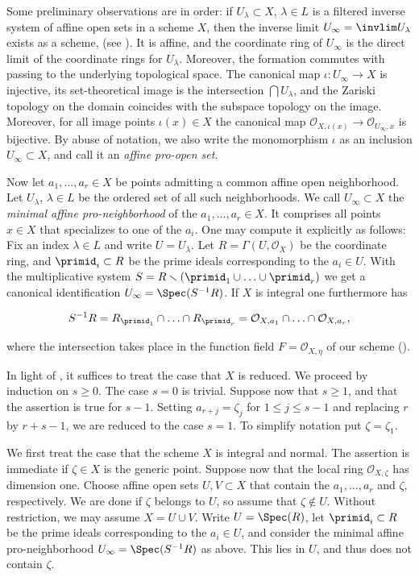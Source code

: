 \documentclass[12pt]{amsart}
\newcommand{\ra}{\rightarrow}
\begin{document}
Some preliminary observations are in order: if $U_\lambda\subset X$, $\lambda\in L$ is a filtered inverse system of affine open sets in a scheme $X$, then the  inverse limit $U_\infty=\invlim U_\lambda$ exists as a scheme, (see \cite[Sec. 8.2]{MR217086}). It is affine, and the coordinate ring of $U_\infty$ is the direct limit of the coordinate rings for $U_\lambda$. Moreover, the formation commutes with passing to the underlying topological space. 
The canonical map $\iota:U_\infty\ra X$ is injective, its set-theoretical image is the intersection $\bigcap U_\lambda$, and the Zariski topology on the domain coincides with the subspace topology on the image.
Moreover, for all image points $\iota(x)\in X$ the canonical map $\mathcal{O}_{X,\iota(x)}\ra \mathcal{O}_{U_\infty,x}$ is bijective. By abuse of notation, we also write the monomorphism $\iota$ as an inclusion  $U_\infty\subset X$, and call it an \emph{affine pro-open set}.
 
Now let $a_1,\ldots,a_r\in X$ be points admitting a common affine open neighborhood. Let $U_\lambda$, $\lambda \in L$ be the ordered set of all such neighborhoods. We call $U_\infty\subset X$ the \emph{minimal affine pro-neighborhood} of the $a_1,\ldots,a_r \in X$. It comprises all points $x\in X$ that specializes to one of the $a_i$.
One may compute it explicitly as follows: Fix an index $\lambda\in L$ and write  $U=U_\lambda$. Let $R=\Gamma(U,\mathcal{O}_X)$ be the coordinate ring, and $\primid_i\subset R$ be the prime ideals corresponding to the $a_i\in U$. With the multiplicative system $S=R\smallsetminus (\primid_1\cup\ldots\cup\primid_r)$ we get a canonical identification $U_\infty=\Spec(S^{-1}R)$. If $X$ is integral one furthermore has 

$$
S^{-1}R=R_{\primid_1}\cap\ldots\cap R_{\primid_r} =\mathcal{O}_{X,a_1}\cap \ldots\cap \mathcal{O}_{X,a_r},
$$

\noindent where the intersection takes place in the function field $F=\mathcal{O}_{X,\eta}$ of our scheme (\cite[Ch. 2, Sec. 3, No. 5 Prop. 17]{MR979760}).

\proof
In light of \cite[Cor. 4.5.9]{EGAI.2}, it suffices to treat the case that $X$ is reduced.
We proceed by induction on $s\geq 0$. The case $s=0$ is trivial. Suppose now that 
$s\geq 1$, and that the assertion is true for $s-1$. Setting $a_{r+j}=\zeta_j$ for $1\leq j\leq s-1$
and replacing $r$ by $r+s-1$, 
we are reduced to the case $s=1$. To simplify notation   put $\zeta=\zeta_1$.

We first treat the case that the scheme $X$ is integral and normal. The assertion is immediate if $\zeta\in X$
is the generic point. Suppose now that the local ring $\mathcal{O}_{X,\zeta}$ has dimension one.
Choose affine open sets $U,V\subset X$ that contain  the $a_1,\ldots,a_r$ and $\zeta$, respectively.
We are done if $\zeta$ belongs to $U$, so     assume that  $\zeta\not\in U$.
Without restriction, we may assume $X=U\cup V$. Write $U=\Spec(R)$,   let $\primid_i\subset R$ be the prime
ideals corresponding to the $a_i\in U$, and consider the minimal affine pro-neighborhood $U_\infty=\Spec(S^{-1}R)$ as above.
This lies in $U$, and thus does not contain $\zeta$. 
\end{document}
